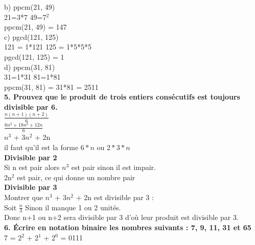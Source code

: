 b) ppcm(21, 49) \\

21=3*7  49=7$^{2}$ \\
ppcm(21, 49) = 147 \\

c) pgcd(121, 125) \\

121 = 1*121  125 = 1*5*5*5 \\
pgcd(121, 125) = 1 \\

d) ppcm(31, 81) \\

31=1*31 81=1*81 \\
ppcm(31, 81) = 31*81 = 2511 \\

\textbf{5. Prouvez que le produit de trois entiers consécutifs est toujours divisible par 6.} \\

$\frac{n(n+1)(n+2)} {6}$ \\

$\frac{6n^{3} + 18n^{2} + 12n}{6}$ \\

$n^{3}$ + $3n^{2}$ + 2n \\

il faut qu'il est la forme $6*n$ ou $2*3*n$ \\

\textbf{Divisible par 2} \\

Si n est pair alors $n^{3}$ est pair sinon il est impair. \\

2n$^{2}$ est pair, ce qui donne un nombre pair \\


\textbf{Divisible par 3} \\

Montrer que $n^{3}$ + $3n^{2}$ + 2n est divisible par 3 : \\

Soit $\frac{n}{3}$ Sinon il manque 1 ou 2 unités. \\

Donc n+1 ou n+2 sera divisible par 3 d'où leur produit est divisible par 3.\\


\textbf{6. Écrire en notation binaire les nombres suivants : 7, 9, 11, 31 et 65} \\

7 = 2$^{2}$ + 2$^{1}$ + 2$^{0}$ = 0111 \\

